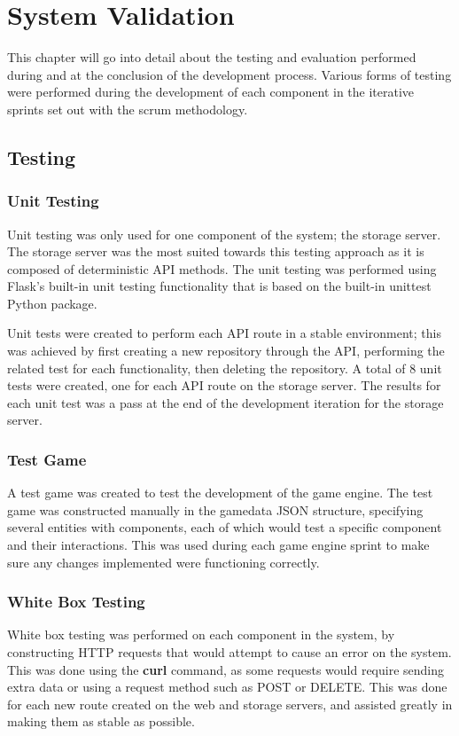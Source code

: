\chapter{System Validation}
This chapter will go into detail about the testing and evaluation performed during and at the conclusion of the development process. Various forms of testing were performed during the development of each component in the iterative sprints set out with the scrum methodology.

\section{Testing}
	\subsection{Unit Testing}
	Unit testing was only used for one component of the system; the storage server. The storage server was the most suited towards this  testing approach as it is composed of deterministic API methods. The unit testing was performed using Flask's built-in unit testing functionality that is based on the built-in unittest Python package.

	Unit tests were created to perform each API route in a stable environment; this was achieved by first creating a new repository through the API, performing the related test for each functionality, then deleting the repository. A total of 8 unit tests were created, one for each API route on the storage server. The results for each unit test was a pass at the end of the development iteration for the storage server.

	\subsection{Test Game}
	A test game was created to test the development of the game engine. The test game was constructed manually in the gamedata JSON structure, specifying several entities with components, each of which would test a specific component and their interactions. This was used during each game engine sprint to make sure any changes implemented were functioning correctly.

	\subsection{White Box Testing}
	White box testing was performed on each component in the system, by constructing HTTP requests that would attempt to cause an error on the system. This was done using the \textbf{curl} command, as some requests would require sending extra data or using a request method such as POST or DELETE. This was done for each new route created on the web and storage servers, and assisted greatly in making them as stable as possible.

